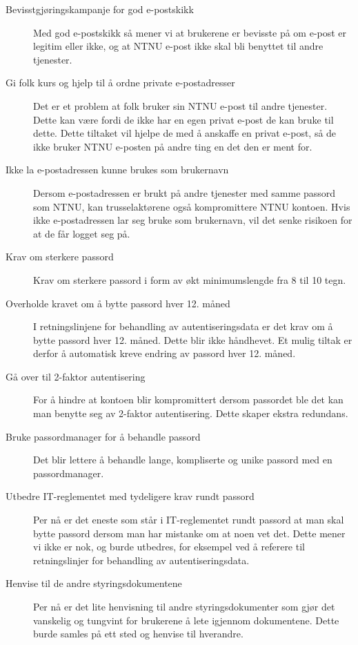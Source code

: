 \begin{description}
\item[Bevisstgjøringskampanje for god e-postskikk]
Med god e-postskikk så mener vi at brukerene er bevisste på om e-post er legitim eller ikke, og at NTNU e-post ikke skal bli benyttet til andre tjenester.

\item[Gi folk kurs og hjelp til å ordne private e-postadresser]
Det er et problem at folk bruker sin NTNU e-post til andre tjenester. Dette kan være fordi de ikke har en egen privat e-post de kan bruke til dette. Dette tiltaket vil hjelpe de med å anskaffe en privat e-post, så de ikke bruker NTNU e-posten på andre ting en det den er ment for.

\item[Ikke la e-postadressen kunne brukes som brukernavn]
Dersom e-postadressen er brukt på andre tjenester med samme passord som NTNU, kan trusselaktørene også kompromittere NTNU kontoen. Hvis ikke e-postadressen lar seg bruke som brukernavn, vil det senke risikoen for at de får logget seg på. 

\item[Krav om sterkere passord]
Krav om sterkere passord i form av økt minimumslengde fra 8 til 10 tegn. 

\item[Overholde kravet om å bytte passord hver 12. måned]
I retningslinjene for behandling av autentiseringsdata er det krav om å bytte passord hver 12. måned. Dette blir ikke håndhevet. Et mulig tiltak er derfor å automatisk kreve endring av passord hver 12. måned. 

\item[Gå over til 2-faktor autentisering]
For å hindre at kontoen blir kompromittert dersom passordet ble det kan man benytte seg av 2-faktor autentisering. Dette skaper ekstra redundans. 

\item[Bruke passordmanager for å behandle passord]
Det blir lettere å behandle lange, kompliserte og unike passord med en passordmanager. 

\item[Utbedre IT-reglementet med tydeligere krav rundt passord]
Per nå er det eneste som står i IT-reglementet rundt passord at man skal bytte passord dersom man har mistanke om at noen vet det. Dette mener vi ikke er nok, og burde utbedres, for eksempel ved å referere til retningslinjer for behandling av autentiseringsdata. 

\item[Henvise til de andre styringsdokumentene]
Per nå er det lite henvisning til andre styringsdokumenter som gjør det vanskelig og tungvint for brukerene å lete igjennom dokumentene. Dette burde samles på ett sted og henvise til hverandre.


\end{description}
